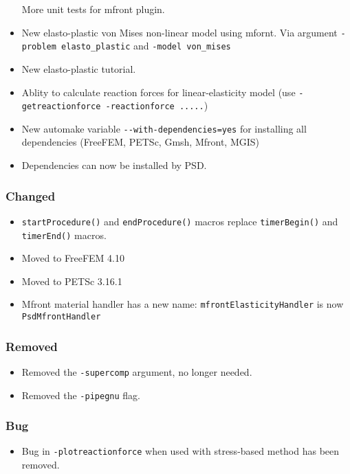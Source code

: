 \begin{itemize}
  More unit tests for mfront plugin.
\item
  New elasto-plastic von Mises non-linear model using mfornt. Via
  argument \lstinline!-problem elasto_plastic! and
  \lstinline!-model von_mises!
\item
  New elasto-plastic tutorial.
\item
  Ablity to calculate reaction forces for linear-elasticity model (use
  \lstinline!-getreactionforce -reactionforce .....!)
\item
  New automake variable \lstinline!--with-dependencies=yes! for
  installing all dependencies (FreeFEM, PETSc, Gmsh, Mfront, MGIS)
\item
  Dependencies can now be installed by PSD.
\end{itemize}

\subsubsection{Changed}

\begin{itemize}
\item
  \lstinline!startProcedure()! and \lstinline!endProcedure()! macros
  replace \lstinline!timerBegin()! and \lstinline!timerEnd()! macros.
\item
  Moved to FreeFEM 4.10
\item
  Moved to PETSc 3.16.1
\item
  Mfront material handler has a new name:
  \lstinline!mfrontElasticityHandler! is now
  \lstinline!PsdMfrontHandler!
\end{itemize}

\subsubsection{Removed}

\begin{itemize}
\tightlist
\item
  Removed the \lstinline!-supercomp! argument, no longer needed.
\item
  Removed the \lstinline!-pipegnu! flag.
\end{itemize}

\subsubsection{Bug}

\begin{itemize}
\tightlist
\item
  Bug in \lstinline!-plotreactionforce! when used with stress-based
  method has been removed.
\end{itemize}


